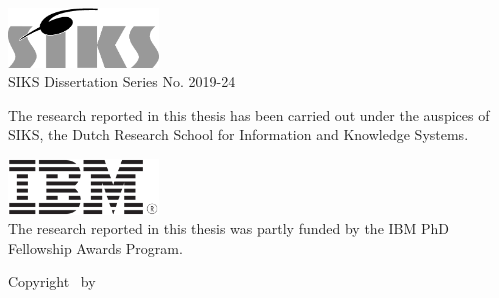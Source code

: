 \thispagestyle{empty}

\begin{addmargin}[-3cm]{1cm}
\vfill

\includegraphics[width=4cm]{front_back_matter/imgs/siks_zw.eps}\\
SIKS Dissertation Series No. 2019-24\bigskip
  

\noindent The research reported in this thesis has been carried out under the auspices of SIKS, the Dutch Research School for Information and Knowledge Systems.\bigskip\bigskip

\noindent \includegraphics[width=4cm]{front_back_matter/imgs/ibm.png}\\
The research reported in this thesis was partly funded by the IBM PhD Fellowship Awards Program.\bigskip\bigskip


\vfill
Copyright \textcopyright\ \myTime by \myName
\end{addmargin}